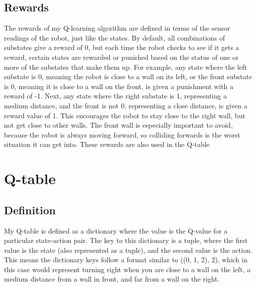 \documentclass[letterpaper, 10 pt, conference]{ieeeconf}  %
\begin{document}
\subsection{Rewards} The rewards of my Q-learning algorithm are defined in terms of the sensor readings of the robot, just like the states. By default, all combinations of substates give a reward of 0, but each time the robot checks to see if it gets a reward, certain states are rewarded or punished based on the status of one or more of the substates that make them up.
For example, any state where the left substate is 0, meaning the robot is close to a wall on its left, or the front substate is 0, meaning it is close to a wall on the front, is given a punishment with a reward of -1. Next, any state where the right substate is 1, representing a medium distance, and the front is not 0, representing a close distance, is given a reward value of 1. This encourages the robot to stay close to the right wall, but not get close to other walls. The front wall is especially important to avoid, because the robot is always moving forward, so colliding forwards is the worst situation it can get into. These rewards are also used in the Q-table

\addtolength{\textheight}{-10cm}   %

\section{Q-table}

\subsection{Definition}

My Q-table is defined as a dictionary where the value is the Q-value for a particular state-action pair. The key to this dictionary is a tuple, where the first value is the state (also represented as a tuple), and the second value is the action. This means the dictionary keys follow a format similar to ((0, 1, 2), 2), which in this case would represent turning right when you are close to a wall on the left, a medium distance from a wall in front, and far from a wall on the right.
\end{document}
